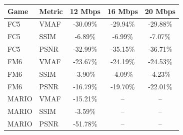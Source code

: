 \begin{tabular}{llccc}
\toprule
Game & Metric & 12 Mbps & 16 Mbps & 20 Mbps \\
\midrule
FC5 & VMAF & -30.09\% & -29.94\% & -29.88\% \\
FC5 & SSIM & -6.89\% & -6.99\% & -7.07\% \\
FC5 & PSNR & -32.99\% & -35.15\% & -36.71\% \\
\midrule
FM6 & VMAF & -23.67\% & -24.19\% & -24.53\% \\
FM6 & SSIM & -3.90\% & -4.09\% & -4.23\% \\
FM6 & PSNR & -16.79\% & -19.70\% & -22.01\% \\
\midrule
MARIO & VMAF & -15.21\% & -- & -- \\
MARIO & SSIM & -3.59\% & -- & -- \\
MARIO & PSNR & -51.78\% & -- & -- \\
\bottomrule
\end{tabular}
